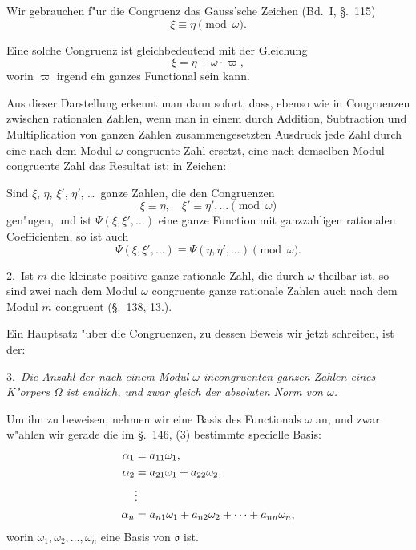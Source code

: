 \documentclass[12pt,a4paper]{article}
\theoremstyle{definition}
\begin{document}
Wir gebrauchen f"ur die Congruenz das Gauss'sche Zeichen (Bd.~I, \S.~115)
\begin{equation}
\xi \equiv \eta \pmod{\omega}.
\end{equation}

Eine solche Congruenz ist gleichbedeutend mit der Gleichung
\begin{equation}
\xi = \eta + \omega \cdot \varpi,
\end{equation}
worin $\varpi$ irgend ein ganzes Functional sein kann.

Aus dieser Darstellung erkennt man dann sofort, dass, ebenso wie in Congruenzen zwischen rationalen Zahlen, wenn man in einem durch Addition, Subtraction und Multiplication von ganzen Zahlen zusammengesetzten Ausdruck jede Zahl durch eine nach dem Modul $\omega$ congruente Zahl ersetzt, eine nach demselben Modul congruente Zahl das Resultat ist; in Zeichen:

Sind $\xi$, $\eta$, $\xi'$, $\eta'$, \dots\ ganze Zahlen, die den Congruenzen
\begin{equation}
\xi \equiv \eta, \quad \xi' \equiv \eta', \dots \pmod{\omega}
\end{equation}
gen"ugen, und ist $\Psi(\xi, \xi', \dots)$ eine ganze Function mit ganzzahligen rationalen Coefficienten, so ist auch
\begin{equation}
\Psi(\xi, \xi', \dots) \equiv \Psi(\eta, \eta', \dots) \pmod{\omega}.
\end{equation}

2.~Ist $m$ die kleinste positive ganze rationale Zahl, die durch $\omega$ theilbar ist, so sind zwei nach dem Modul $\omega$ congruente ganze rationale Zahlen auch nach dem Modul $m$ congruent (\S.~138, 13.).

Ein Hauptsatz "uber die Congruenzen, zu dessen Beweis wir jetzt schreiten, ist der:

3.~\emph{Die Anzahl der nach einem Modul $\omega$ incongruenten ganzen Zahlen eines K"orpers $\Omega$ ist endlich, und zwar gleich der absoluten Norm von $\omega$.}

Um ihn zu beweisen, nehmen wir eine Basis des Functionals $\omega$ an, und zwar w"ahlen wir gerade die im \S.~146, (3) bestimmte specielle Basis:
\begin{align}
\alpha_1 &= a_{11}\omega_1, \notag \\
\alpha_2 &= a_{21}\omega_1 + a_{22}\omega_2, \notag \\
&\vdots \\
\alpha_n &= a_{n1}\omega_1 + a_{n2}\omega_2 + \dots + a_{nn}\omega_n, \notag
\end{align}
worin $\omega_1, \omega_2, \dots, \omega_n$ eine Basis von $\mathfrak{o}$ ist.
\end{document}
